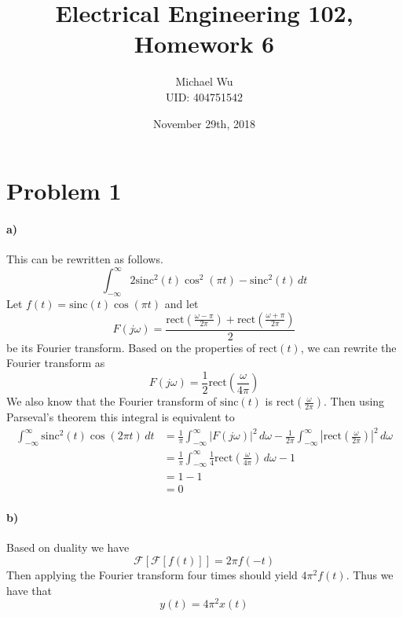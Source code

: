 \documentclass[12pt]{article}
\begin{document}
\title{Electrical Engineering 102, Homework 6}
\date{November 29th, 2018}
\author{Michael Wu\\UID: 404751542}
\maketitle


\section*{Problem 1}

\paragraph{a)}

This can be rewritten as follows.
\[\int_{-\infty}^\infty 2\text{sinc}^2(t)\cos^2(\pi t) - \text{sinc}^2(t)\, dt\]
Let \(f(t)=\text{sinc}(t)\cos(\pi t)\) and let
\[F(j\omega)=\frac{\text{rect}\left(\frac{\omega-\pi}{2\pi}\right)+\text{rect}\left(\frac{\omega+\pi}{2\pi}\right)}{2}\]
be its Fourier transform. Based on the properties of \(\text{rect}(t)\), we can rewrite the Fourier transform as
\[F(j\omega)=\frac{1}{2}\text{rect}\left(\frac{\omega}{4\pi}\right)\]
We also know that the Fourier transform of \(\text{sinc}(t)\) is \(\text{rect}\left(\frac{\omega}{2\pi}\right)\).
Then using Parseval's theorem this integral is equivalent to
\begin{align*}
    \int_{-\infty}^\infty \text{sinc}^2(t)\cos(2\pi t)\, dt
    &=\frac{1}{\pi}\int_{-\infty}^{\infty} |F(j\omega)|^2\,d\omega - \frac{1}{2\pi} \int_{-\infty}^\infty \left|\text{rect}\left(\frac{\omega}{2\pi}\right)\right|^2\,d\omega\\
    &=\frac{1}{\pi}\int_{-\infty}^{\infty}\frac{1}{4}\text{rect}\left(\frac{\omega}{4\pi}\right)\,d\omega - 1\\
    &=1-1\\
    &=0
\end{align*}

\paragraph{b)}

Based on duality we have
\[\mathcal{F}[\mathcal{F}[f(t)]]=2\pi f(-t)\]
Then applying the Fourier transform four times should yield \(4\pi^2 f(t)\). Thus we have that
\[y(t)=4\pi^2x(t)\]
\end{document}
